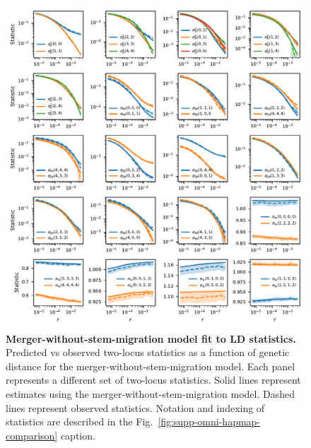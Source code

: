 \documentclass[]{article}
\begin{document}
\begin{figure}[ht]
    \centering
    \includegraphics{figures/supp-merger-without-stem-migration-fits.pdf}
    \caption{
        \textbf{Merger-without-stem-migration model fit to LD statistics.}
        Predicted vs observed two-locus statistics as a function of genetic
        distance for the merger-without-stem-migration model. Each panel
        represents a different set of two-locus statistics.
        Solid lines represent estimates using the
        merger-without-stem-migration model.
        Dashed lines represent observed statistics.
        Notation and indexing of statistics are described in the
        Fig.~\ref{fig:supp-omni-hapmap-comparison} caption.
    }
    \label{fig:supp-merger-without-stem-migration-fits}
\end{figure}
\end{document}

